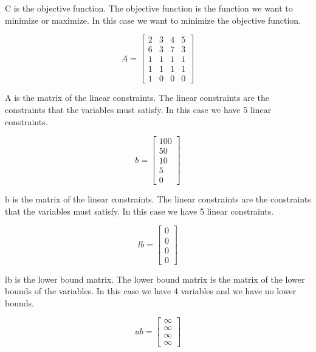 C is the objective function. The objective function is the function we want to minimize or maximize. In this case we want to minimize the objective function.

\begin{equation}
A = 
\begin{bmatrix}
    2 & 3 & 4 & 5 \\
    6 & 3 & 7 & 3 \\
    1 & 1 & 1 & 1 \\
    1 & 1 & 1 & 1 \\
    1 & 0 & 0 & 0 
\end{bmatrix}
\end{equation}

A is the matrix of the linear constraints. The linear constraints are the constraints that the variables must satisfy. In this case we have 5 linear constraints.

\begin{equation}
b =\begin{bmatrix}
    100 \\
    50 \\
    10 \\
    5 \\
    0
\end{bmatrix}
\end{equation}

b is the matrix of the linear constraints. The linear constraints are the constraints that the variables must satisfy. In this case we have 5 linear constraints.

\begin{equation}
lb = \begin{bmatrix}
    0 \\
    0 \\
    0 \\
    0
\end{bmatrix}
\end{equation}

lb is the lower bound matrix. The lower bound matrix is the matrix of the lower bounds of the variables. In this case we have 4 variables and we have no lower bounds.

\begin{equation}
ub = \begin{bmatrix}
    \infty  \\
    \infty  \\
    \infty  \\
    \infty 
\end{bmatrix}
\end{equation}

